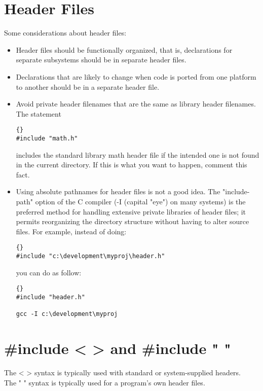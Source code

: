 \documentclass{report}
\begin{document}
\section{Header Files} 
Some considerations about header files:
\begin{itemize}
\item Header files should be functionally organized, that is, declarations for separate subsystems should be in separate header files.

\item Declarations that are likely to change when code is ported from one platform to another should be in a separate header file. 

\item Avoid private header filenames that are the same as library header filenames. The statement
\begin{lstlisting}{}
#include "math.h"
\end{lstlisting}
includes the standard library math header file if the intended one is not found in the current directory. If this is what you want to happen, comment this fact.

\item Using absolute pathnames for header files is not a good idea. The "include-path" option of the C compiler (-I (capital "eye") on many systems) is the preferred method for handling extensive private libraries of header files; it permits reorganizing the directory structure without having to alter source files. For example, instead of doing:
\begin{lstlisting}{}
#include "c:\development\myproj\header.h"
\end{lstlisting}
you can do as follow:
\begin{lstlisting}{}
#include "header.h"

gcc -I c:\development\myproj
\end{lstlisting}

\end{itemize}


\section{\#include < > and \#include " "}
The < > syntax is typically used with standard or system-supplied headers.\\
The " " syntax is typically used for a program's own header files.
	
\end{document}
